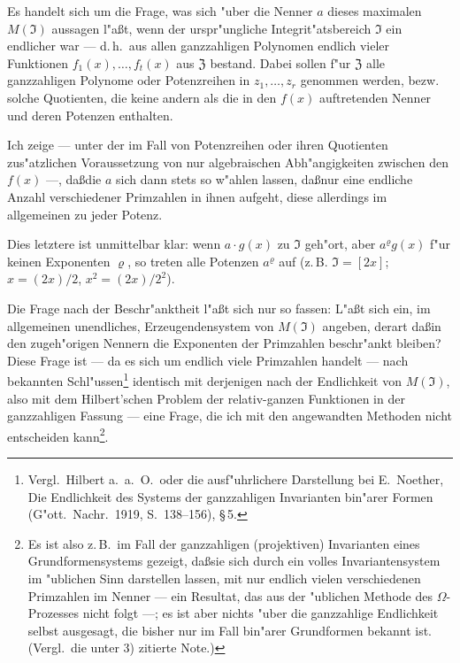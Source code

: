 \documentclass[12pt,a4paper]{article}
\theoremstyle{plain}
\begin{document}
Es handelt sich um die Frage, was sich "uber die Nenner $a$ dieses maximalen $M(\mathfrak{I})$ aussagen l"a\ss t, wenn der urspr"ungliche Integrit"atsbereich $\mathfrak{I}$ ein endlicher war --- d.\,h.\ aus allen ganzzahligen Polynomen endlich vieler Funktionen $f_1(x),\ldots,f_t(x)$ aus $\mathfrak{Z}$ bestand. Dabei sollen f"ur $\mathfrak{Z}$ alle ganzzahligen Polynome oder Potenzreihen in $z_1,\ldots,z_r$ genommen werden, bezw. solche Quotienten, die keine andern als die in den $f(x)$ auftretenden Nenner und deren Potenzen enthalten.

Ich zeige --- unter der im Fall von Potenzreihen oder ihren Quotienten zus"atzlichen Voraussetzung von nur algebraischen Abh"angigkeiten zwischen den $f(x)$ ---, da\ss die $a$ sich dann stets so w"ahlen lassen, da\ss nur eine endliche Anzahl verschiedener Primzahlen in ihnen aufgeht, diese allerdings im allgemeinen zu jeder Potenz.

Dies letztere ist unmittelbar klar: wenn $a \cdot g(x)$ zu $\mathfrak{I}$ geh"ort, aber $a^\varrho g(x)$ f"ur keinen Exponenten $\varrho$, so treten alle Potenzen $a^\varrho$ auf (z.\,B. $\mathfrak{I} = [2x]$; $x = (2x)/2$, $x^2 = (2x)/2^2$).

Die Frage nach der Beschr"anktheit l"a\ss t sich nur so fassen: L"a\ss t sich ein, im allgemeinen unendliches, Erzeugendensystem von $M(\mathfrak{I})$ angeben, derart da\ss in den zugeh"origen Nennern die Exponenten der Primzahlen beschr"ankt bleiben? Diese Frage ist --- da es sich um endlich viele Primzahlen handelt --- nach bekannten Schl"ussen\footnote{Vergl.\ Hilbert a.\ a.\ O.\ oder die ausf"uhrlichere Darstellung bei E.\ Noether, Die Endlichkeit des Systems der ganzzahligen Invarianten bin"arer Formen (G"ott.\ Nachr.\ 1919, S.\ 138--156), \S\,5.} identisch mit derjenigen nach der Endlichkeit von $M(\mathfrak{I})$, also mit dem Hilbert'schen Problem der relativ-ganzen Funktionen in der ganzzahligen Fassung --- eine Frage, die ich mit den angewandten Methoden nicht entscheiden kann\footnote{Es ist also z.\,B.\ im Fall der ganzzahligen (projektiven) Invarianten eines Grundformensystems gezeigt, da\ss sie sich durch ein volles Invariantensystem im "ublichen Sinn darstellen lassen, mit nur endlich vielen verschiedenen Primzahlen im Nenner --- ein Resultat, das aus der "ublichen Methode des $\Omega$-Prozesses nicht folgt ---; es ist aber nichts "uber die ganzzahlige Endlichkeit selbst ausgesagt, die bisher nur im Fall bin"arer Grundformen bekannt ist. (Vergl.\ die unter 3) zitierte Note.)}.
\end{document}
